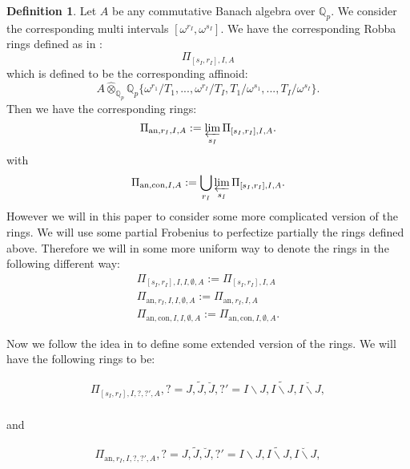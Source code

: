 \documentclass[12pt]{amsart}
\theoremstyle{definition}
\newtheorem{definition}[theorem]{Definition}
\numberwithin{equation}{section}
\begin{document}
\begin{definition}
Let $A$ be any commutative Banach algebra over $\mathbb{Q}_p$. We consider the corresponding multi intervals $[\omega^{r_I},\omega^{s_I}]$. We have the corresponding Robba rings defined as in \cite[Definition 2.4]{T1}:
\begin{displaymath}
\Pi_{[s_I,r_I],I,A}	
\end{displaymath}
which is defined to be the corresponding affinoid:
\begin{displaymath}
A\widehat{\otimes}_{\mathbb{Q}_p}\mathbb{Q}_p\{\omega^{r_1}/T_1,...,\omega^{r_I}/T_I,T_1/\omega^{s_1},...,T_I/\omega^{s_I}\}.	
\end{displaymath}
Then we have the corresponding rings:
\begin{displaymath}
\Pi_{\mathrm{an},r_I,I,A}:= \varprojlim_{s_I} \Pi_{[s_I,r_I],I,A}.			
\end{displaymath}
with 
\begin{displaymath}
\Pi_{\mathrm{an,con},I,A}:= \bigcup_{r_I}\varprojlim_{s_I} \Pi_{[s_I,r_I],I,A}.			
\end{displaymath}
However we will in this paper to consider some more complicated version of the rings. We will use some partial Frobenius to perfectize partially the rings defined above. Therefore we will in some more uniform way to denote the rings in the following different way:
\begin{align}
\Pi_{[s_I,r_I],I,I,\emptyset,A}:=\Pi_{[s_I,r_I],I,A}\\
\Pi_{\mathrm{an},r_I,I,I,\emptyset,A}:=\Pi_{\mathrm{an},r_I,I,A}\\
\Pi_{\mathrm{an,con},I,I,\emptyset,A}:=\Pi_{\mathrm{an,con},I,\emptyset,A}.	
\end{align}
	
\end{definition}

\indent Now we follow the idea in \cite[Definition 5.2.1]{Ked2} to define some extended version of the rings. We will have the following rings to be:


\begin{align}
\Pi_{[s_I,r_I],I,?,?',A},?=J,\widetilde{J},\breve{J},?'=I\backslash J,\widetilde{I\backslash J},\breve{I\backslash J},\\		
\end{align}


and 

\begin{align}
\Pi_{\mathrm{an},r_I,I,?,?',A},?=J,\widetilde{J},\breve{J},?'=I\backslash J,\widetilde{I\backslash J},\breve{I\backslash J},\\ 	
\end{align}
\end{document}
